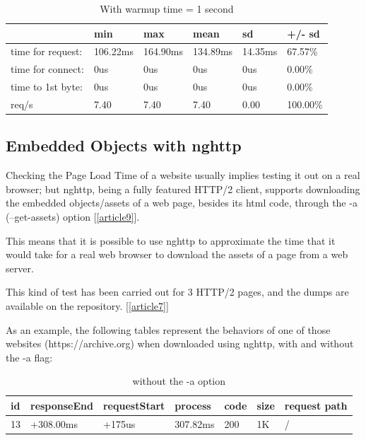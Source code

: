 \documentclass[a4paper,10pt]{article}
\begin{document}
\begin{table}[h!]
\centering
\begin{tabular}{|l|l|l|l|l|l|}
\hline
                  & min      & max      & mean     & sd      & +/- sd   \\ \hline
time for request: & 106.22ms & 164.90ms & 134.89ms & 14.35ms & 67.57\%  \\ \hline
time for connect: & 0us      & 0us      & 0us      & 0us     & 0.00\%   \\ \hline
time to 1st byte: & 0us      & 0us      & 0us      & 0us     & 0.00\%   \\ \hline
req/s             & 7.40     & 7.40     & 7.40     & 0.00    & 100.00\% \\ \hline
\end{tabular}

\caption{With warmup time = 1 second}
\label{fig:table5}

\end{table}


\subsection{Embedded Objects with nghttp}


Checking the Page Load Time of a website usually implies testing it out on a real browser; but nghttp, being a fully featured HTTP/2 client, supports downloading the embedded objects/assets of a web page, besides its html code, through the -a (--get-assets) option [\ref{article9}]. 


This means that it is possible to use nghttp to approximate the time that it would take for a real web browser to download the assets of a page from a web server.  

This kind of test has been carried out for 3 HTTP/2 pages, and the dumps are available on the repository. [\ref{article7}]

As an example, the following tables represent the behaviors of one of those websites (https://archive.org) when downloaded using nghttp, with and without the -a flag:


\begin{table}[h!]
\centering
\begin{tabular}{|l|l|l|l|l|l|l|}
\hline
id & responseEnd & requestStart & process  & code & size & request path \\ \hline
13 & +308.00ms   & +175us       & 307.82ms & 200  & 1K   & /            \\ \hline

\end{tabular}

\caption{without the -a option}
\label{fig:table6}
\end{table}
\end{document}
